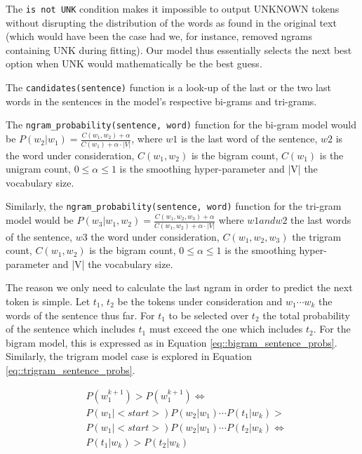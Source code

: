\documentclass[11pt, a4paper]{article}
\begin{document}
	The \texttt{is not UNK} condition makes it impossible to output UNKNOWN tokens without disrupting the distribution of the words as found in the original text (which would have been the case had we, for instance, removed ngrams containing UNK during fitting). Our model thus essentially selects the next best option when UNK would mathematically be the best guess.
	
	The \texttt{candidates(sentence)} function is a look-up of the last or the two last words in the sentences in the model's respective bi-grams and tri-grams.
	
	The \texttt{ngram\_probability(sentence, word)} function for the bi-gram model would be $ P(w_2|w_1) = \frac{C(w_1,w_2) + \alpha}{C(w_1) + \alpha \cdot|V|} $, where  $w1$ is the last word of the sentence, $w2$ is the word under consideration, $ C(w_1,w_2) $ is the bigram count, $ C(w_1) $ is the unigram count, $ 0 \leq\alpha \leq1 $ is the smoothing hyper-parameter and |V| the vocabulary size.
	
	Similarly, the \texttt{ngram\_probability(sentence, word)} function for the tri-gram model would be $ P(w_3|w_1,w_2) = \frac{C(w_1,w_2,w_3) + \alpha}{C(w_1,w_2) + \alpha \cdot |V|} $ where  $w1 and w2$ the last words of the sentence, $w3$ the word under consideration, $ C(w_1,w_2,w_3) $ the trigram count, $ C(w_1,w_2) $ is the bigram count, $ 0 \leq\alpha \leq1 $ is the smoothing hyper-parameter and |V| the vocabulary size.
	
	The reason we only need to calculate the last ngram in order to predict the next token is simple. Let $t_1$, $t_2$ be the tokens under consideration and $w_1 \cdots w_k$ the words of the sentence thus far. For $t_1$ to be selected over $t_2$ the total probability of the sentence which includes $t_1$ must exceed the one which includes $t_2$. For the bigram model, this is expressed as in Equation \ref{eq::bigram_sentence_probs}. Similarly, the trigram model case is explored in Equation \ref{eq::trigram_sentence_probs}. 
	
	\begin{equation}
		\label{eq::bigram_sentence_probs}
		\begin{aligned}
			& P(w^{k+1}_1) > P(w^{k+1}_1) \iff \\
			& P(w_1|<start>) P(w_2|w_1) \cdots P(t_1|w_k) > \\
			& P(w_1|<start>) P(w_2|w_1) \cdots P(t_2|w_k) \iff \\
			& P(t_1|w_k) > P(t_2|w_k)
		\end{aligned}
	\end{equation}
	
\end{document}
